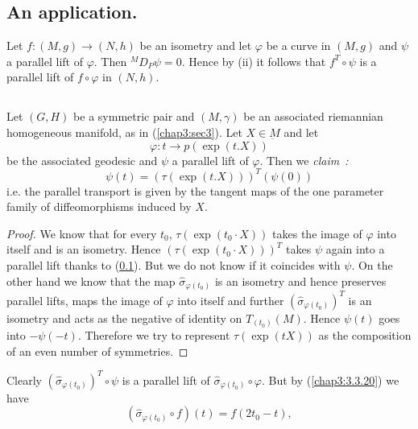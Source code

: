 \setcounter{subsection}{6}
\subsection{An application.}\label{chap5:5.1.7}
Let $f:(M,g)\to (N,h)$ be an isometry and let $\varphi$ be a curve in
$(M,g)$ and $\psi$ a parallel lift of $\varphi$. Then
${}^{M}D_{P}\psi=0$. Hence by (ii) it follows that $f^{T}\circ \psi$
is a parallel lift of $f\circ\varphi$ in $(N,h)$.

\subsection{}\label{chap5:5.1.8}

\begin{example*}
Let $(G,H)$ be a symmetric pair and $(M,\gamma)$ be an associated
riemannian homogeneous manifold, as in (\ref{chap3:sec3}). Let\pageoriginale
$X\in\underbar{M}$ and let
$$
\varphi:t\to p(\exp(t.X))
$$
be the associated geodesic and $\psi$ a parallel lift of
$\varphi$. Then we {\em claim~:}
$$
\psi(t)=(\tau(\exp(t.X)))^{T}(\psi(0))
$$
i.e. the parallel transport is given by the tangent maps of the one
parameter family of diffeomorphisms induced by $X$.
\end{example*}

\begin{proof}
We know that for every $t_{0}$, $\tau(\exp(t_{0}\cdot X))$ takes the
image of $\varphi$ into itself and is an isometry. Hence
$(\tau(\exp(t_{0}\cdot X)))^{T}$ takes $\psi$ again into a parallel
lift thanks to (\ref{chap5:5.1.7}). But we do not know if it coincides with
$\psi$. On the other hand we know that the map
$\widehat{\sigma}_{\varphi(t_{0})}$ is an isometry and hence preserves
parallel lifts, maps the image of $\varphi$ into itself and further
$(\widehat{\sigma}_{\varphi(t_{0})})^{T}$ is an isometry and acts as
the negative of identity on $T_{(t_{0})}(M)$. Hence $\psi(t)$ goes
into $-\psi(-t)$. Therefore we try to represent $\tau(\exp(tX))$ as
the composition of an even number of symmetries.
\end{proof}

Clearly $(\widehat{\sigma}_{\varphi(t_{0})})^{T}\circ \psi$ is a
parallel lift of $\widehat{\sigma}_{\varphi(t_{0})}\circ\varphi$. But
by (\ref{chap3:3.3.20}) we have
$$
(\widehat{\sigma}_{\varphi(t_{0})}\circ f)(t)=f(2t_{0}-t),
$$

